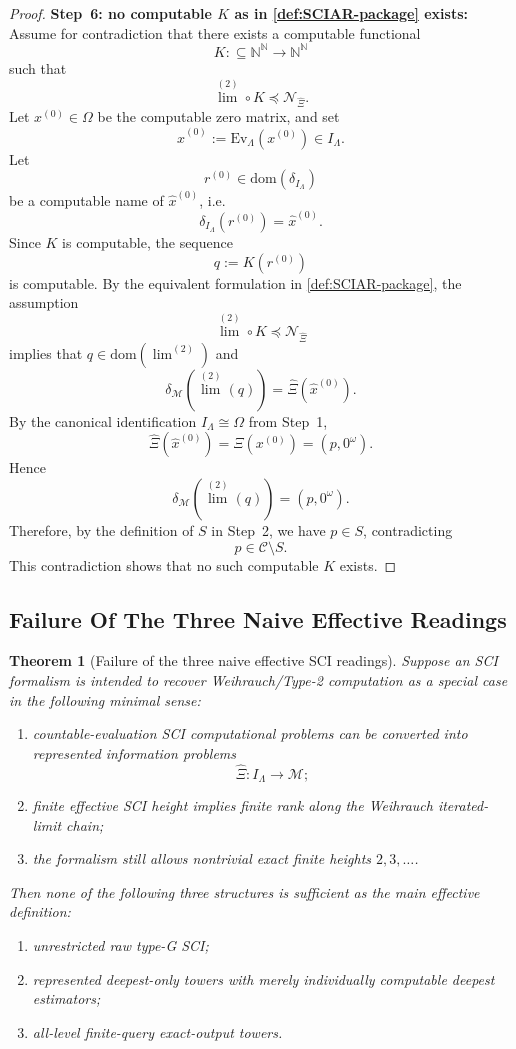 \documentclass{lmcs} %
\theoremstyle{plain}
\theoremstyle{plain}
\newtheorem{theorem}{Theorem}[section]
\theoremstyle{definition}
\theoremstyle{remark}
\theoremstyle{definition}
\theoremstyle{remark}
\numberwithin{equation}{section}
\newcommand{\dom}{\mathrm{dom}}
\newcommand{\Lim}{\operatorname{lim}}
\newcommand{\Limi}[1]{\Lim^{(#1)}}
\begin{document}
\begin{proof}
	\smallskip
	\noindent
	\textbf{Step~6: no computable $K$ as in \cref{def:SCIAR-package} exists:}
Assume for contradiction that there exists a computable functional
\[
K\colon\subseteq \mathbb N^{\mathbb N}\to\mathbb N^{\mathbb N}
\]
such that
\[
\Limi{2}\circ K \preceq \mathcal N_{\widehat{\Xi}}.
\]
Let $x^{(0)}\in\Omega$ be the computable zero matrix, and set
\[
\widehat{x}^{(0)}:= \mathrm{Ev}_{\Lambda}(x^{(0)})\in I_{\Lambda}.
\]
Let
\[
r^{(0)}\in\dom(\delta_{I_{\Lambda}})
\]
be a computable name of $\widehat{x}^{(0)}$, i.e.
\[
\delta_{I_{\Lambda}}(r^{(0)})=\widehat{x}^{(0)}.
\]
Since $K$ is computable, the sequence
\[
q:=K(r^{(0)})
\]
is computable. By the equivalent formulation in \cref{def:SCIAR-package}, the assumption
\[
\Limi{2}\circ K \preceq \mathcal N_{\widehat{\Xi}}
\]
implies that $q\in\dom(\Limi{2})$ and
\[
\delta_{\mathcal M}(\Limi{2}(q))=\widehat{\Xi}(\widehat{x}^{(0)}).
\]
By the canonical identification $I_{\Lambda}\cong\Omega$ from Step~1,
\[
\widehat{\Xi}(\widehat{x}^{(0)})=\Xi(x^{(0)})=(p,0^\omega).
\]
Hence
\[
\delta_{\mathcal M}(\Limi{2}(q))=(p,0^\omega).
\]
Therefore, by the definition of $S$ in Step~2, we have $p\in S$, contradicting
\[
p\in\mathcal C\setminus S.
\]
This contradiction shows that no such computable $K$ exists.
\end{proof}

\subsection{Failure Of The Three Naive Effective Readings}\label{sec:three-naive-readings}

\begin{theorem}[Failure of the three naive effective SCI readings]\label{thm:logical-necessity-uniform-implementation}
Suppose an SCI formalism is intended to recover Weihrauch/Type-2 computation as a special case in the following minimal sense:
\begin{enumerate}
\item countable-evaluation SCI computational problems can be converted into represented information problems
\[
        \widehat{\Xi}: I_\Lambda\to \mathcal M;
\]
\item finite effective SCI height implies finite rank along the Weihrauch iterated-limit chain;
\item the formalism still allows nontrivial exact finite heights \(2,3,\ldots\).
\end{enumerate}
Then none of the following three structures is sufficient as the main effective
definition:
\begin{enumerate}
\item unrestricted raw type-G SCI;
\item represented deepest-only towers with merely individually computable deepest estimators;
\item all-level finite-query exact-output towers.
\end{enumerate}
\end{theorem}
\end{document}
